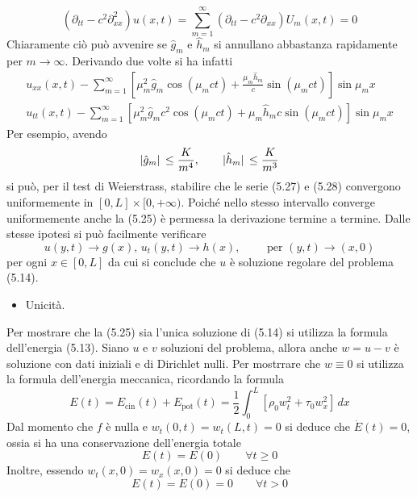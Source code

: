 \documentclass[a4paper,12pt, draft]{article}
\theoremstyle{break}
\numberwithin{equation}{section}
\begin{document}
\begin{equation}
  (\partial_{tt} - c^2\partial^2_{xx})u(x,t) = \sum_{m=1}^{\infty} (\partial_{tt} - c^2\partial_{xx})U_m(x,t) = 0
\end{equation}
Chiaramente ciò può avvenire se \(\hat{g}_m\) e \(\hat{h}_m\) si annullano abbastanza rapidamente per \(m \to \infty\). Derivando due volte si ha infatti
\begin{eqnarray}
  u_{xx}(x,t) - \sum_{m=1}^{\infty} \left[\mu^2_m \hat{g}_m \cos (\mu_m ct) + \frac{\mu_m \hat{h}_m}{c} \sin (\mu_m ct)\right] \sin \mu_m x \\
  u_{tt}(x,t) - \sum_{m=1}^{\infty} \left[\mu^2_m \hat{g}_m c^2\cos (\mu_m ct) + \mu_m \hat{h}_m c \sin (\mu_m ct)\right] \sin \mu_m x
\end{eqnarray}
Per esempio, avendo
\begin{equation}
  \abs*{\hat{g}_m}\leq \frac{K}{m^4}, \qquad \abs*{\hat{h}_m} \leq \frac{K}{m^3}
\end{equation}
si può, per il test di Weierstrass, stabilire che le serie (5.27) e (5.28) convergono uniformemente in \([0, L] \times [0, +\infty)\). Poiché nello stesso intervallo converge uniformemente anche la (5.25) è permessa la derivazione termine a termine.
Dalle stesse ipotesi si può facilmente verificare
\begin{equation}
  u(y,t) \to g(x), \, u_t(y,t) \to h(x), \qquad \mbox{ per } (y,t) \to (x,0)
\end{equation}
per ogni \(x \in [0,L]\) da cui si conclude che \(u\) è soluzione regolare del problema (5.14). 
\begin{itemize}
  \item Unicità.
\end{itemize} 
Per mostrare che la (5.25) sia l'unica soluzione di (5.14) si utilizza la formula dell'energia (5.13). Siano \(u \mbox{ e } v\) soluzioni del problema, allora anche \(w = u - v\) è soluzione con dati iniziali e di Dirichlet nulli. Per mostrrare che \(w \equiv 0\) si utilizza la formula dell'energia meccanica, ricordando la formula
\[
  E(t) = E_{\text{cin}}(t)+ E_{\text{pot}}(t) = \frac{1}{2}\int_0^L [\rho_0 w^2_t + \tau_0 w^2_x] \, dx
\]
Dal momento che \(f\) è nulla e \(w_t(0,t) = w_t(L,t) = 0\) si deduce che \(\dot{E}(t) = 0\), ossia si ha una conservazione dell'energia totale
\begin{equation}
  E(t) = E(0) \qquad \forall t \geq 0
\end{equation}
Inoltre, essendo \(w_t(x,0) = w_x(x, 0) = 0\) si deduce che 
\[
  E(t) = E(0) = 0 \qquad \forall t > 0
\]
\end{document}
